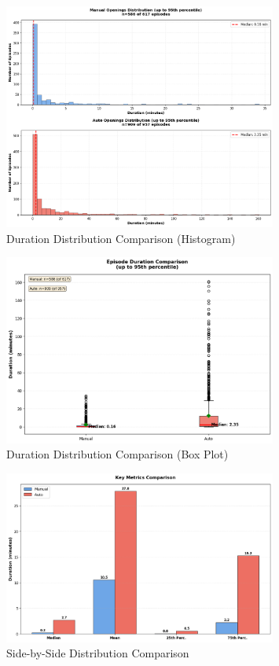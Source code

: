\documentclass[12pt,a4paper]{article}
\begin{document}
\begin{figure}[H]
    \centering
    \includegraphics[width=0.8\textwidth]{plots/histogram.png}
    \caption{Duration Distribution Comparison (Histogram)}
\end{figure}

\begin{figure}[H]
    \centering
    \includegraphics[width=0.8\textwidth]{plots/boxplot.png}
    \caption{Duration Distribution Comparison (Box Plot)}
\end{figure}

\begin{figure}[H]
    \centering
    \includegraphics[width=0.8\textwidth]{plots/comparison.png}
    \caption{Side-by-Side Distribution Comparison}
\end{figure}
\end{document}
